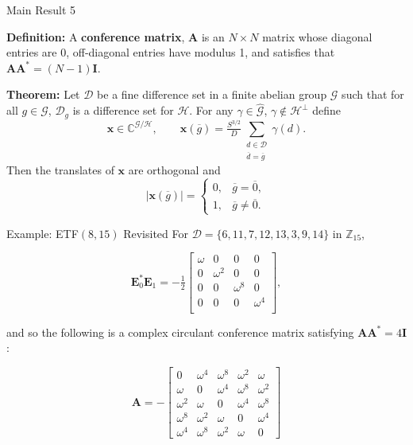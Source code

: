 \documentclass[12pt]{beamer}
\newcommand{\bbC}{\mathbb{C}}
\newcommand{\bbZ}{\mathbb{Z}}
\newcommand{\bfA}{\mathbf{A}}
\newcommand{\bfE}{\mathbf{E}}
\newcommand{\bfI}{\mathbf{I}}
\newcommand{\bfx}{\mathbf{x}}
\newcommand{\calD}{\mathcal{D}}
\newcommand{\calG}{\mathcal{G}}
\newcommand{\calH}{\mathcal{H}}
\newcommand{\abs}[1]{|{#1}|}
\begin{document}
\begin{frame}{Main Result 5}

\textbf{Definition:} A \textbf{conference matrix}, $\bfA$ is an $N\times N$ matrix whose diagonal entries are 0, off-diagonal entries have modulus 1, and satisfies that $\bfA\bfA^*=(N-1)\bfI$.

\vfill

\textbf{Theorem:}
Let $\calD$ be a fine difference set in a finite abelian group $\calG$ such that for all $g\in\calG$, $\calD_g$ is a difference set for $\calH$. For any $\gamma\in\hat{\calG}$, $\gamma\not\in\calH^\perp$ define 
\begin{equation*}
	\bfx\in\bbC^{\calG/\calH}, \qquad \bfx(\overline{g})=\tfrac{S^{3/2}}{D}\sum_{\substack{d\in\calD\\\overline{d}=\overline{g}}}\gamma(d).
\end{equation*}
Then the translates of $\bfx$ are orthogonal and 
$$\abs{\bfx(\overline{g})}=\left\{\begin{array}{cc}
0, & \overline{g}=\overline{0},\\
1, & \overline{g}\not=\overline{0}.
\end{array}\right.$$

\end{frame}

\begin{frame}{Example: ETF$(8,15)$ Revisited}
For $\calD=\{6,11,7,12,13,3,9,14\}$ in $\bbZ_{15}$,

\begin{equation*}
    \bfE_0^*\bfE_1^{}=-\tfrac{1}{2}\left[\begin{array}{cccc}
    \omega & 0 & 0 & 0  \\
    0 & \omega^{2} & 0 & 0  \\
    0 & 0 & \omega^{8} & 0  \\
    0 & 0 & 0 & \omega^{4}  \\
    \end{array}\right], 
\end{equation*}

and so the following is a complex circulant conference matrix satisfying $\bfA\bfA^*=4\bfI$:

\begin{equation*}
\bfA=-\left[
\begin{array}{ccccc}
0 & \omega^4 & \omega^8 & \omega^2 & \omega \\		
\omega & 0 & \omega^4 & \omega^8 & \omega^2 \\
\omega^2 & \omega & 0 & \omega^4 & \omega^8 \\
\omega^8 & \omega^2 & \omega & 0 & \omega^4 \\
\omega^4 & \omega^8 & \omega^2 & \omega & 0
\end{array}
\right]
\end{equation*}

\end{frame}
\end{document}
